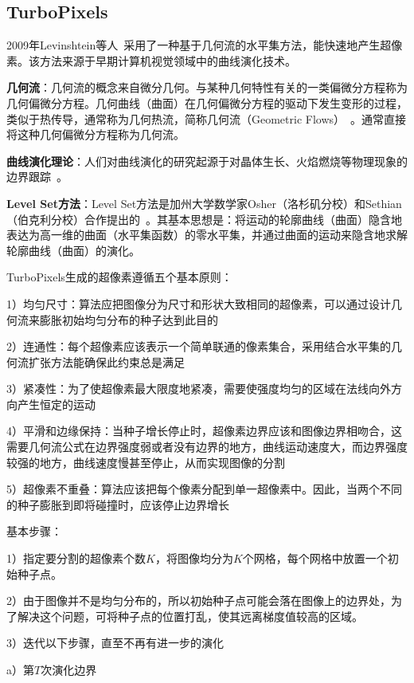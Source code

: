 \documentclass[12pt]{article}
\begin{document}
\subsection{TurboPixels}

2009年Levinshtein等人~\cite{levinshtein2009turbopixels}采用了一种基于几何流的水平集方法，能快速地产生超像素。该方法来源于早期计算机视觉领域中的曲线演化技术。

\textbf{几何流}：几何流的概念来自微分几何。与某种几何特性有关的一类偏微分方程称为几何偏微分方程。几何曲线（曲面）在几何偏微分方程的驱动下发生变形的过程，类似于热传导，通常称为几何热流，简称几何流（Geometric Flows）~\cite{sapiro2006geometric, bakas2005algebraic}。通常直接将这种几何偏微分方程称为几何流。

\textbf{曲线演化理论}：人们对曲线演化的研究起源于对晶体生长、火焰燃烧等物理现象的边界跟踪~\cite{sethian1985curvature}。

\textbf{Level Set方法}：Level Set方法是加州大学数学家Osher（洛杉矶分校）和Sethian（伯克利分校）合作提出的~\cite{osher1988fronts}。其基本思想是：将运动的轮廓曲线（曲面）隐含地表达为高一维的曲面（水平集函数）的零水平集，并通过曲面的运动来隐含地求解轮廓曲线（曲面）的演化。

TurboPixels生成的超像素遵循五个基本原则：

1）均匀尺寸：算法应把图像分为尺寸和形状大致相同的超像素，可以通过设计几何流来膨胀初始均匀分布的种子达到此目的

2）连通性：每个超像素应该表示一个简单联通的像素集合，采用结合水平集的几何流扩张方法能确保此约束总是满足

3）紧凑性：为了使超像素最大限度地紧凑，需要使强度均匀的区域在法线向外方向产生恒定的运动

4）平滑和边缘保持：当种子增长停止时，超像素边界应该和图像边界相吻合，这需要几何流公式在边界强度弱或者没有边界的地方，曲线运动速度大，而边界强度较强的地方，曲线速度慢甚至停止，从而实现图像的分割

5）超像素不重叠：算法应该把每个像素分配到单一超像素中。因此，当两个不同的种子膨胀到即将碰撞时，应该停止边界增长

基本步骤：

1）指定要分割的超像素个数$K$，将图像均分为$K$个网格，每个网格中放置一个初始种子点。

2）由于图像并不是均匀分布的，所以初始种子点可能会落在图像上的边界处，为了解决这个问题，可将种子点的位置打乱，使其远离梯度值较高的区域。

3）迭代以下步骤，直至不再有进一步的演化
 
a）第$T$次演化边界
\end{document}
